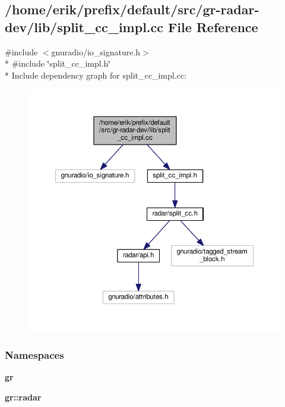 \subsection{/home/erik/prefix/default/src/gr-\/radar-\/dev/lib/split\+\_\+cc\+\_\+impl.cc File Reference}
\label{split__cc__impl_8cc}
{\ttfamily \#include $<$gnuradio/io\+\_\+signature.\+h$>$}\\*
{\ttfamily \#include \char`\"{}split\+\_\+cc\+\_\+impl.\+h\char`\"{}}\\*
Include dependency graph for split\+\_\+cc\+\_\+impl.\+cc\+:
\nopagebreak
\begin{figure}[H]
\begin{center}
\leavevmode
\includegraphics[width=350pt]{da/d70/split__cc__impl_8cc__incl}
\end{center}
\end{figure}
\subsubsection*{Namespaces}
\begin{DoxyCompactItemize}
\item 
 {\bf gr}
\item 
 {\bf gr\+::radar}
\end{DoxyCompactItemize}
